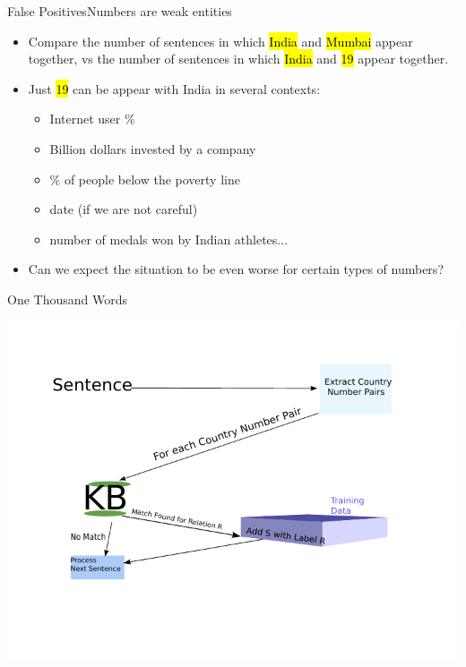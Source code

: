 \documentclass{beamer}
\makeatletter
\newcommand\SoulColor{%
  \let\set@color\beamerorig@set@color
  \let\reset@color\beamerorig@reset@color}
\makeatother
\begin{document}
\begin{frame}{False Positives}{Numbers are weak entities}
 \begin{itemize}  
 \item Compare the number of sentences in which {\SoulColor\hl{India}} and {\SoulColor\hl{Mumbai}} appear together, vs the number of sentences
  in which {\SoulColor\hl{India}} and {\SoulColor\hl{19}} appear together.
 \item Just {\SoulColor\hl{19}} can be appear with India in several contexts:
 \begin{itemize}
 \item Internet user \%
 \item Billion dollars invested by a company
 \item \% of people below the poverty line
 \item date (if we are not careful)
 \item number of medals won by Indian athletes...
\end{itemize}

 \item Can we expect the situation to be even worse for certain types of numbers?
\end{itemize}
\end{frame}
\begin{frame}{One Thousand Words}
 \begin{center}
 \includegraphics{./imgs/simple.pdf}
\end{center}

\end{frame}
\end{document}
